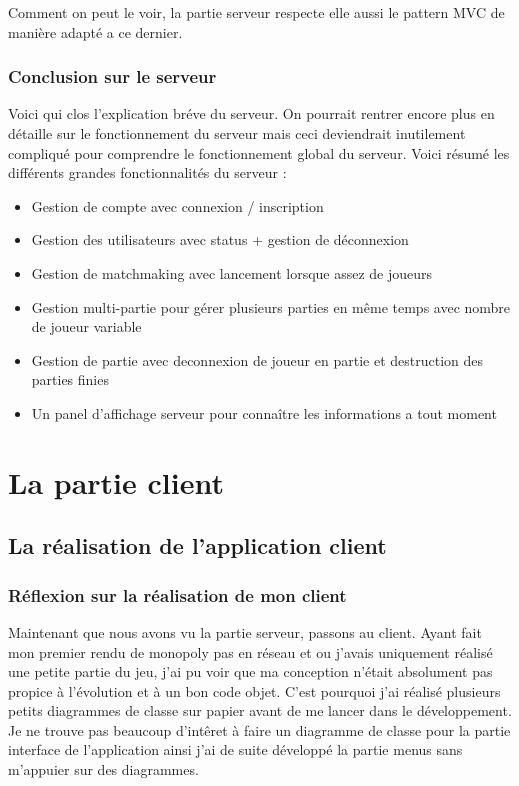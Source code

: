 \documentclass[12pt, openany]{report}
\begin{document}
	Comment on peut le voir, la partie serveur respecte elle aussi le pattern MVC de manière adapté a ce dernier.

    \section{Conclusion sur le serveur}
	Voici qui clos l'explication bréve du serveur. On pourrait rentrer encore plus en détaille sur le fonctionnement du serveur mais ceci deviendrait inutilement compliqué pour comprendre le fonctionnement global du serveur. Voici résumé les différents grandes fonctionnalités du serveur :
    \begin{itemize}
	\item Gestion de compte avec connexion / inscription
	\item Gestion des utilisateurs avec status + gestion de déconnexion
	\item Gestion de matchmaking avec lancement lorsque assez de joueurs
	\item Gestion multi-partie pour gérer plusieurs parties en même temps avec nombre de joueur variable
	\item Gestion de partie avec deconnexion de joueur en partie et destruction des parties finies
	\item Un panel d'affichage serveur pour connaître les informations a tout moment
    \end{itemize}

    

\part{La partie client}
  \chapter{La réalisation de l'application client}
    \section{Réflexion sur la réalisation de mon client}
    Maintenant que nous avons vu la partie serveur, passons au client. Ayant fait mon premier rendu de monopoly pas en réseau et ou j'avais uniquement réalisé une petite partie du jeu, j'ai pu voir que ma conception n'était absolument pas propice à l'évolution et à un bon code objet. C'est pourquoi j'ai réalisé plusieurs petits diagrammes de classe sur papier avant de me lancer dans le développement. Je ne trouve pas beaucoup d'intêret à faire un diagramme de classe pour la partie interface de l'application ainsi j'ai de suite développé la partie menus sans m'appuier sur des diagrammes.
\end{document}
